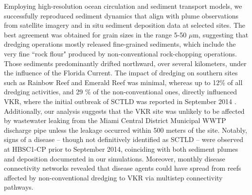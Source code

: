 \documentclass[preprint,12pt,authoryear]{elsarticle}
\begin{document}
Employing high-resolution ocean circulation and sediment transport models, we successfully reproduced sediment dynamics that align with plume observations from satellite imagery and in situ sediment deposition data at selected sites. The best agreement was obtained for grain sizes in the range 5-50 $\mu$m, suggesting that dredging operations mostly released fine-grained sediments, which include the very fine ``rock flour" produced by non-conventional rock-chopping operations. Those sediments predominantly drifted northward, over several kilometers, under the influence of the Florida Current. The impact of dredging on southern sites such as Rainbow Reef and Emerald Reef was minimal, whereas up to 12\% of all dredging activities, and 29 \% of the non-conventional ones, directly influenced VKR, where the initial outbreak of SCTLD was reported in September 2014 \citep{precht2016unprecedented}. Additionally, our analysis suggests that the VKR site was unlikely to be affected by wastewater leaking from the Miami Central District Municipal WWTP discharge pipe unless the leakage occurred within 500 meters of the site. Notably, signs of a disease -- though not definitively identified as SCTLD -- were observed at HBSC1-CP prior to September 2014, coinciding with both sediment plumes and deposition documented in our simulations. Moreover, monthly disease connectivity networks revealed that disease agents could have spread from reefs affected by non-conventional dredging to VKR via multistep connectivity pathways.
\end{document}
